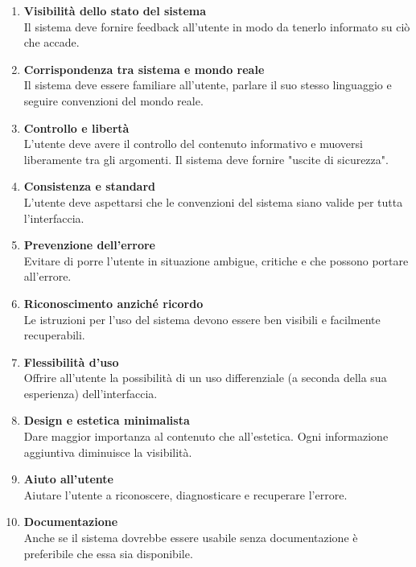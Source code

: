\documentclass[12pt,a4paper]{report}
\begin{document}
\begin{enumerate}
  \item \textbf{Visibilità dello stato del sistema}\\Il sistema deve fornire feedback all'utente in modo da tenerlo informato su ciò che accade.
  \item \textbf{Corrispondenza tra sistema e mondo reale}\\Il sistema deve essere familiare all'utente, parlare il suo stesso linguaggio e seguire convenzioni del mondo reale.
  \item \textbf{Controllo e libertà}\\L'utente deve avere il controllo del contenuto informativo e muoversi liberamente tra gli argomenti. Il sistema deve fornire "uscite di sicurezza".
  \item \textbf{Consistenza e standard}\\L’utente deve aspettarsi che le convenzioni del sistema siano valide per tutta l’interfaccia.
  \item \textbf{Prevenzione dell'errore}\\Evitare di porre l’utente in situazione ambigue, critiche e che possono portare all’errore.
  \item \textbf{Riconoscimento anziché ricordo}\\Le istruzioni per l’uso del sistema devono essere ben visibili e facilmente recuperabili.
  \item \textbf{Flessibilità d’uso}\\Offrire all’utente la possibilità di un uso differenziale (a seconda della sua esperienza) dell’interfaccia.
  \item \textbf{Design e estetica minimalista}\\Dare maggior importanza al contenuto che all’estetica. Ogni informazione aggiuntiva diminuisce la visibilità.
  \item \textbf{Aiuto all’utente}\\Aiutare l’utente a riconoscere, diagnosticare e recuperare l’errore.
  \item \textbf{Documentazione}\\Anche se il sistema dovrebbe essere usabile senza documentazione è preferibile che essa sia disponibile.
\end{enumerate}
\end{document}
